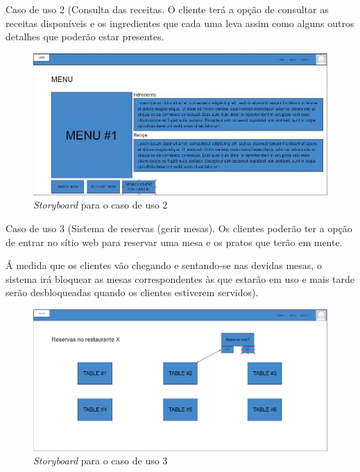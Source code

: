 Caso de uso 2 (Consulta das receitas. O cliente terá a opção de consultar as receitas disponíveis e os ingredientes que cada uma leva assim como alguns outros detalhes que poderão estar presentes.

\begin{figure}[!hbt]
    \centering
    \includegraphics[width=14cm]{Resources/Previous/image-106.jpg}
    \caption{\textit{Storyboard} para o caso de uso 2}
    
\end{figure}
\FloatBarrier

Caso de uso 3 (Sistema de reservas (gerir mesas). Os clientes poderão ter a opção de entrar no sítio web para reservar uma mesa e os pratos que terão em mente.

Á medida que os clientes vão chegando e sentando-se nas devidas mesas, o sistema irá bloquear as mesas correspondentes às que estarão em uso e mais tarde serão desbloqueadas quando os clientes estiverem servidos).

\begin{figure}[!hbt]
    \centering
    \includegraphics[width=14cm]{Resources/Previous/image-107.png}
    \caption{\textit{Storyboard} para o caso de uso 3}
    
\end{figure}
\FloatBarrier

